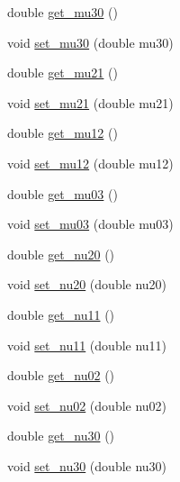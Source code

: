 \begin{DoxyCompactItemize}
double \mbox{\hyperlink{classorg_1_1opencv_1_1imgproc_1_1_moments_ab5c500ea31f9b0da7ee2308e2bf8215d}{get\+\_\+mu30}} ()
\item 
void \mbox{\hyperlink{classorg_1_1opencv_1_1imgproc_1_1_moments_a65fb7be2cf0dcaff0c2e5c38c0a71a22}{set\+\_\+mu30}} (double mu30)
\item 
double \mbox{\hyperlink{classorg_1_1opencv_1_1imgproc_1_1_moments_ad91a59f0c7620ddfd5a9c078eb1be2ee}{get\+\_\+mu21}} ()
\item 
void \mbox{\hyperlink{classorg_1_1opencv_1_1imgproc_1_1_moments_ac5fc36268c807d3f5815dc1720ec21dd}{set\+\_\+mu21}} (double mu21)
\item 
double \mbox{\hyperlink{classorg_1_1opencv_1_1imgproc_1_1_moments_a3639ac49ccaa73da322e5afb9cdb7812}{get\+\_\+mu12}} ()
\item 
void \mbox{\hyperlink{classorg_1_1opencv_1_1imgproc_1_1_moments_abca29787334723f04699143f68f0d793}{set\+\_\+mu12}} (double mu12)
\item 
double \mbox{\hyperlink{classorg_1_1opencv_1_1imgproc_1_1_moments_a2bf7fe95bcd9b998921ec25db357845a}{get\+\_\+mu03}} ()
\item 
void \mbox{\hyperlink{classorg_1_1opencv_1_1imgproc_1_1_moments_aa671e85ee3ad4158b945dfbd52421fe8}{set\+\_\+mu03}} (double mu03)
\item 
double \mbox{\hyperlink{classorg_1_1opencv_1_1imgproc_1_1_moments_a0c27d22bd3eeaa992c9f65ec8e3a5dd7}{get\+\_\+nu20}} ()
\item 
void \mbox{\hyperlink{classorg_1_1opencv_1_1imgproc_1_1_moments_afb76dfb705450573e937ba2a251e66fb}{set\+\_\+nu20}} (double nu20)
\item 
double \mbox{\hyperlink{classorg_1_1opencv_1_1imgproc_1_1_moments_ad882c990995b9bbfad1890b237c5df29}{get\+\_\+nu11}} ()
\item 
void \mbox{\hyperlink{classorg_1_1opencv_1_1imgproc_1_1_moments_a0f2c82c283a5473174a67a14c0bbb806}{set\+\_\+nu11}} (double nu11)
\item 
double \mbox{\hyperlink{classorg_1_1opencv_1_1imgproc_1_1_moments_ab4df8dc2480bb0efc536e910382afada}{get\+\_\+nu02}} ()
\item 
void \mbox{\hyperlink{classorg_1_1opencv_1_1imgproc_1_1_moments_a5cd351632ecb86280f21005fb5582be6}{set\+\_\+nu02}} (double nu02)
\item 
double \mbox{\hyperlink{classorg_1_1opencv_1_1imgproc_1_1_moments_a9c7b446b131bd1f512f91e81d8e685fa}{get\+\_\+nu30}} ()
\item 
void \mbox{\hyperlink{classorg_1_1opencv_1_1imgproc_1_1_moments_a28a088f0ee44892eb1b8703ac937f113}{set\+\_\+nu30}} (double nu30)

\end{DoxyCompactItemize}
